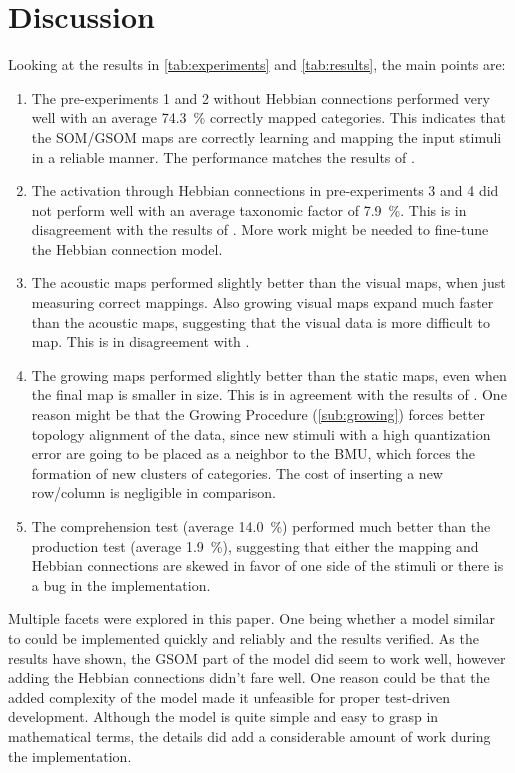 \documentclass[twocolumn]{article}
\begin{document}
\section{Discussion} \label{sec:discussion}
Looking at the results in \autoref{tab:experiments} and \autoref{tab:results}, the main points are:
\begin{enumerate}
    \item
        The pre-experiments 1 and 2 without Hebbian connections performed very well with an average 74.3~\% correctly mapped categories. This indicates that the SOM/GSOM maps are correctly learning and mapping the input stimuli in a reliable manner. The performance matches the results of \textcite{gliozzi_visual_2018}.
    \item
        The activation through Hebbian connections in pre-experiments 3 and 4 did not perform well with an average taxonomic factor of 7.9~\%. This is in disagreement with the results of \textcite{gliozzi_visual_2018}. More work might be needed to fine-tune the Hebbian connection model.
    \item
        The acoustic maps performed slightly better than the visual maps, when just measuring correct mappings. Also growing visual maps expand much faster than the acoustic maps, suggesting that the visual data is more difficult to map. This is in disagreement with \textcite{gliozzi_visual_2018}.
    \item
        The growing maps performed slightly better than the static maps, even when the final map is smaller in size. This is in agreement with the results of \textcite{gliozzi_visual_2018}. One reason might be that the Growing Procedure (\autoref{sub:growing}) forces better topology alignment of the data, since new stimuli with a high quantization error are going to be placed as a neighbor to the BMU, which forces the formation of new clusters of categories. The cost of inserting a new row/column is negligible in comparison.
    \item
        The comprehension test (average 14.0~\%) performed much better than the production test (average 1.9~\%), suggesting that either the mapping and Hebbian connections are skewed in favor of one side of the stimuli or there is a bug in the implementation.
\end{enumerate}
Multiple facets were explored in this paper. One being whether a model similar to \textcite{gliozzi_visual_2018} could be implemented quickly and reliably and the results verified. As the results have shown, the GSOM part of the model did seem to work well, however adding the Hebbian connections didn't fare well. One reason could be that the added complexity of the model made it unfeasible for proper test-driven development. Although the model is quite simple and easy to grasp in mathematical terms, the details did add a considerable amount of work during the implementation.
\end{document}
